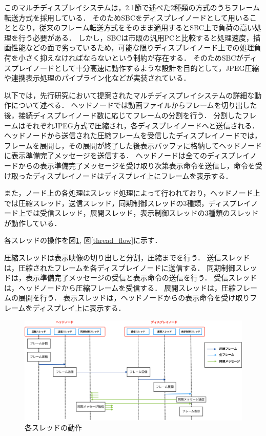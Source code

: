 このマルチディスプレイシステムは，2.1節で述べた2種類の方式のうちフレーム転送方式を採用している．
そのためSBCをディスプレイノードとして用いることとなり，従来のフレーム転送方式をそのまま適用するとSBC上で負荷の高い処理を行う必要がある．
しかし，SBCは市販の汎用PCと比較すると処理速度，描画性能などの面で劣っているため，可能な限りディスプレイノード上での処理負荷を小さく抑えなければならないという制約が存在する．
そのためSBCがディスプレイノードとして十分高速に動作するような設計を目的として，JPEG圧縮や連携表示処理のパイプライン化などが実装されている．

以下では，先行研究において提案されたマルチディスプレイシステムの詳細な動作について述べる．
ヘッドノードでは動画ファイルからフレームを切り出した後，接続ディスプレイノード数に応じてフレームの分割を行う．
分割したフレームはそれぞれJPEG方式で圧縮され，各ディスプレイノードへと送信される．
ヘッドノードから送信された圧縮フレームを受信したディスプレイノードでは，フレームを展開し，その展開が終了した後表示バッファに格納してヘッドノードに表示準備完了メッセージを送信する．
ヘッドノードは全てのディスプレイノードからの表示準備完了メッセージを受け取り次第表示命令を送信し，命令を受け取ったディスプレイノードはディスプレイ上にフレームを表示する．

また，ノード上の各処理はスレッド処理によって行われており，ヘッドノード上では圧縮スレッド，送信スレッド，同期制御スレッドの3種類，ディスプレイノード上では受信スレッド，展開スレッド，表示制御スレッドの3種類のスレッドが動作している．

各スレッドの操作を図\ref{frow_system}, 図\ref{thread_flow}に示す．

圧縮スレッドは表示映像の切り出しと分割，圧縮までを行う．
送信スレッドは，圧縮されたフレームを各ディスプレイノードに送信する．
同期制御スレッドは，表示準備完了メッセージの受信と表示命令の送信を行う．
受信スレッドは，ヘッドノードから圧縮フレームを受信する．
展開スレッドは，圧縮フレームの展開を行う．
表示スレッドは，ヘッドノードからの表示命令を受け取りフレームをディスプレイ上に表示する．

\begin{center}
  \begin{figure}[H]
      \hspace*{\fill}
      \includegraphics[width=1.1\linewidth]{./fig/chap2/frow_system.eps}
      \hspace*{\fill}
      \caption{各スレッドの動作}
      \label{frow_system}
  \end{figure}
  \end{center}

